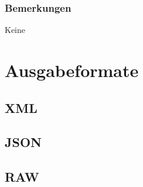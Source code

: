 \documentclass[a4,12pt]{scrartcl}
\begin{document}
\subsubsection{Bemerkungen}
Keine

\newpage
\section{Ausgabeformate}
\subsection{XML}
\subsection{JSON}
\subsection{RAW}
\end{document}
